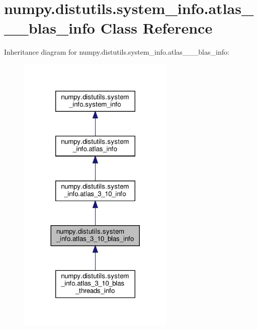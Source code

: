 \hypertarget{classnumpy_1_1distutils_1_1system__info_1_1atlas__3__10__blas__info}{}\section{numpy.\+distutils.\+system\+\_\+info.\+atlas\+\_\+\_\+\_\+blas\+\_\+info Class Reference}
\label{classnumpy_1_1distutils_1_1system__info_1_1atlas__3__10__blas__info}


Inheritance diagram for numpy.\+distutils.\+system\+\_\+info.\+atlas\+\_\+\_\+\_\+blas\+\_\+info\+:
\nopagebreak
\begin{figure}[H]
\begin{center}
\leavevmode
\includegraphics[width=212pt]{classnumpy_1_1distutils_1_1system__info_1_1atlas__3__10__blas__info__inherit__graph}
\end{center}
\end{figure}


